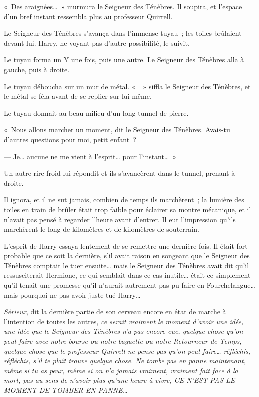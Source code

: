 «~Des araignées…~» murmura le Seigneur des Ténèbres. Il soupira, et l'espace d'un bref instant ressembla plus au professeur Quirrell.

Le Seigneur des Ténèbres s'avança dans l'immense tuyau~; les toiles brûlaient devant lui. Harry, ne voyant pas d'autre possibilité, le suivit.

Le tuyau forma un Y une fois, puis une autre. Le Seigneur des Ténèbres alla à gauche, puis à droite.

Le tuyau déboucha sur un mur de métal. «~~» siffla le Seigneur des Ténèbres, et le métal se fêla avant de se replier sur lui-même.

Le tuyau donnait au beau milieu d'un long tunnel de pierre.

«~Nous allons marcher un moment, dit le Seigneur des Ténèbres. Avais-tu d'autres questions pour moi, petit enfant~?

--- Je… aucune ne me vient à l'esprit… pour l'instant…~»

Un autre rire froid lui répondit et ils s'avancèrent dans le tunnel, prenant à droite.

Il ignora, et il ne sut jamais, combien de temps ils marchèrent~; la lumière des toiles en train de brûler était trop faible pour éclairer sa montre mécanique, et il n'avait pas pensé à regarder l'heure avant d'entrer. Il eut l'impression qu'ils marchèrent le long de kilomètres et de kilomètres de souterrain.

L'esprit de Harry essaya lentement de se remettre une dernière fois. Il était fort probable que ce soit la dernière, s'il avait raison en songeant que le Seigneur des Ténèbres comptait le tuer ensuite… mais le Seigneur des Ténèbres avait dit qu'il ressusciterait Hermione, ce qui semblait dans ce cas inutile… était-ce simplement qu'il tenait une promesse qu'il n'aurait autrement pas pu faire en Fourchelangue… mais pourquoi ne pas avoir juste tué Harry…

\emph{Sérieux}, dit la dernière partie de son cerveau encore en état de marche à l'intention de toutes les autres, \emph{ce serait vraiment le moment d'avoir une idée, une idée que le Seigneur des Ténèbres n'a pas encore eue, quelque chose qu'on peut faire avec notre bourse ou notre baguette ou notre Retourneur de Temps, quelque chose que le professeur Quirrell ne pense pas qu'on peut faire… réfléchis, réfléchis, s'il te plaît trouve quelque chose. Ne tombe pas en panne maintenant, même si tu as peur, même si on n'a jamais vraiment, vraiment fait face à la mort, pas au sens de n'avoir plus qu'une heure à vivre, CE N'EST PAS LE MOMENT DE TOMBER EN PANNE…}

